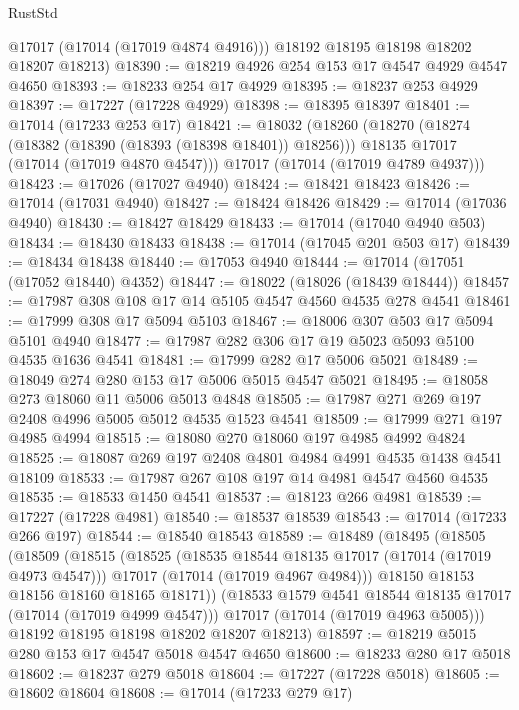 \begin{lexlean}{RustStd}
\begin{coremodule}
{\begin{coremodule}
{{{{{{{{{{{{{{{{{{{{{{{{{{{{{{{{{{{{{{{{{{{{{{{{{{{{{{{        @17017
        (@17014 (@17019 @4874 @4916)))
      @18192
      @18195
      @18198
      @18202
      @18207
      @18213)
@18390 := @18219 @4926 @254 @153 @17 @4547 @4929 @4547 @4650
@18393 := @18233 @254 @17 @4929
@18395 := @18237 @253 @4929
@18397 := @17227 (@17228 @4929)
@18398 := @18395 @18397
@18401 := @17014 (@17233 @253 @17)
@18421 := @18032
    (@18260
      (@18270
        (@18274 (@18382 (@18390 (@18393 (@18398 @18401)) @18256)))
        @18135
        @17017
        (@17014 (@17019 @4870 @4547)))
      @17017
      (@17014 (@17019 @4789 @4937)))
@18423 := @17026 (@17027 @4940)
@18424 := @18421 @18423
@18426 := @17014 (@17031 @4940)
@18427 := @18424 @18426
@18429 := @17014 (@17036 @4940)
@18430 := @18427 @18429
@18433 := @17014 (@17040 @4940 @503)
@18434 := @18430 @18433
@18438 := @17014 (@17045 @201 @503 @17)
@18439 := @18434 @18438
@18440 := @17053 @4940
@18444 := @17014 (@17051 (@17052 @18440) @4352)
@18447 := @18022 (@18026 (@18439 @18444))
@18457 := @17987 @308 @108 @17 @14 @5105 @4547 @4560 @4535 @278 @4541
@18461 := @17999 @308 @17 @5094 @5103
@18467 := @18006 @307 @503 @17 @5094 @5101 @4940
@18477 := @17987 @282 @306 @17 @19 @5023 @5093 @5100 @4535 @1636 @4541
@18481 := @17999 @282 @17 @5006 @5021
@18489 := @18049 @274 @280 @153 @17 @5006 @5015 @4547 @5021
@18495 := @18058 @273 @18060 @11 @5006 @5013 @4848
@18505 := @17987 @271 @269 @197 @2408 @4996 @5005 @5012 @4535 @1523 @4541
@18509 := @17999 @271 @197 @4985 @4994
@18515 := @18080 @270 @18060 @197 @4985 @4992 @4824
@18525 := @18087 @269 @197 @2408 @4801 @4984 @4991 @4535 @1438 @4541 @18109
@18533 := @17987 @267 @108 @197 @14 @4981 @4547 @4560 @4535
@18535 := @18533 @1450 @4541
@18537 := @18123 @266 @4981
@18539 := @17227 (@17228 @4981)
@18540 := @18537 @18539
@18543 := @17014 (@17233 @266 @197)
@18544 := @18540 @18543
@18589 := @18489
    (@18495
      (@18505
        (@18509
          (@18515
            (@18525
              (@18535 @18544 @18135 @17017 (@17014 (@17019 @4973 @4547)))
              @17017
              (@17014 (@17019 @4967 @4984)))
            @18150
            @18153
            @18156
            @18160
            @18165
            @18171))
        (@18533 @1579 @4541 @18544 @18135 @17017 (@17014 (@17019 @4999 @4547)))
        @17017
        (@17014 (@17019 @4963 @5005)))
      @18192
      @18195
      @18198
      @18202
      @18207
      @18213)
@18597 := @18219 @5015 @280 @153 @17 @4547 @5018 @4547 @4650
@18600 := @18233 @280 @17 @5018
@18602 := @18237 @279 @5018
@18604 := @17227 (@17228 @5018)
@18605 := @18602 @18604
@18608 := @17014 (@17233 @279 @17)
}}}}}}}}}}}}}}}}}}}}}}}}}}}}}}}}}}}}}}}}}}}}}}}}}}}}}}}
\end{coremodule}}
\end{coremodule}
\end{lexlean}
